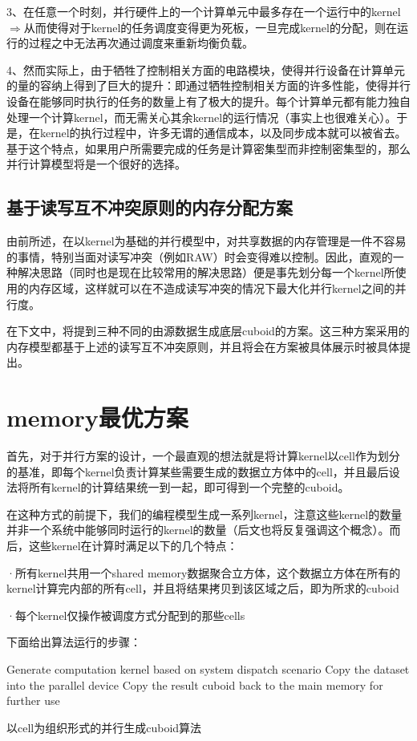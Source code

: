 3、在任意一个时刻，并行硬件上的一个计算单元中最多存在一个运行中的kernel{\quad$\Rightarrow$\quad}从而使得对于kernel的任务调度变得更为死板，一旦完成kernel的分配，则在运行的过程之中无法再次通过调度来重新均衡负载。

4、然而实际上，由于牺牲了控制相关方面的电路模块，使得并行设备在计算单元的量的容纳上得到了巨大的提升：即通过牺牲控制相关方面的许多性能，使得并行设备在能够同时执行的任务的数量上有了极大的提升。每个计算单元都有能力独自处理一个计算kernel，而无需关心其余kernel的运行情况（事实上也很难关心）。于是，在kernel的执行过程中，许多无谓的通信成本，以及同步成本就可以被省去。基于这个特点，如果用户所需要完成的任务是计算密集型而非控制密集型的，那么并行计算模型将是一个很好的选择。

\subsection{基于读写互不冲突原则的内存分配方案}
由前所述，在以kernel为基础的并行模型中，对共享数据的内存管理是一件不容易的事情，特别当面对读写冲突（例如RAW）时会变得难以控制。因此，直观的一种解决思路（同时也是现在比较常用的解决思路）便是事先划分每一个kernel所使用的内存区域，这样就可以在不造成读写冲突的情况下最大化并行kernel之间的并行度。

在下文中，将提到三种不同的由源数据生成底层cuboid的方案。这三种方案采用的内存模型都基于上述的读写互不冲突原则，并且将会在方案被具体展示时被具体提出。

\section{memory最优方案}
首先，对于并行方案的设计，一个最直观的想法就是将计算kernel以cell作为划分的基准，即每个kernel负责计算某些需要生成的数据立方体中的cell，并且最后设法将所有kernel的计算结果统一到一起，即可得到一个完整的cuboid。

在这种方式的前提下，我们的编程模型生成一系列kernel，注意这些kernel的数量并非一个系统中能够同时运行的kernel的数量（后文也将反复强调这个概念）。而后，这些kernel在计算时满足以下的几个特点：

{\quad}·所有kernel共用一个shared memory数据聚合立方体，这个数据立方体在所有的kernel计算完内部的所有cell，并且将结果拷贝到该区域之后，即为所求的cuboid

{\quad}·每个kernel仅操作被调度方式分配到的那些cells

下面给出算法运行的步骤：

\begin{algorithm}[htbp]
\SetAlgoLined
{}
Generate computation kernel based on system dispatch scenario\;
Copy the dataset into the parallel device\;
Copy the result cuboid back to the main memory for further use\;
\caption{以cell为组织形式的并行生成cuboid算法}
\label{algo:algorithm1}
\end{algorithm}

